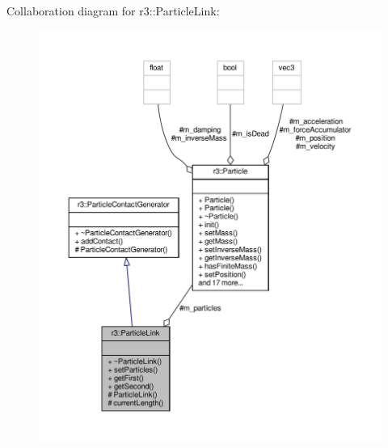 Collaboration diagram for r3\+:\+:Particle\+Link\+:\nopagebreak
\begin{figure}[H]
\begin{center}
\leavevmode
\includegraphics[width=350pt]{classr3_1_1_particle_link__coll__graph}
\end{center}
\end{figure}
